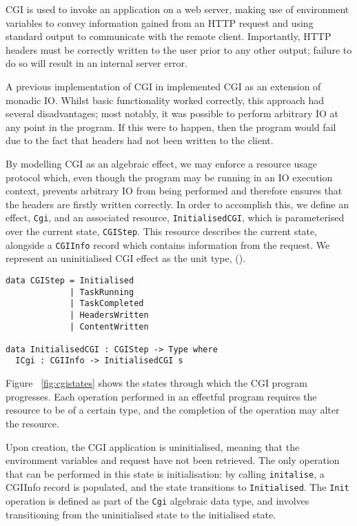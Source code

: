 \documentclass[preprint]{sigplanconf}
\begin{document}
CGI is used to invoke an application on a web server, making use of environment variables to convey information gained from an HTTP request and using standard output to communicate with the remote client. Importantly, HTTP headers must be correctly written to the user prior to any other output; failure to do so will result in an internal server error.

A previous implementation of CGI in \idris{} implemented CGI as an extension of monadic IO. Whilst basic functionality worked correctly, this approach had several disadvantages; most notably, it was possible to perform arbitrary IO at any point in the program. If this were to happen, then the program would fail due to the fact that headers had not been written to the client.

By modelling CGI as an algebraic effect, we may enforce a resource usage protocol which, even though the program may be running in an IO execution context, prevents arbitrary IO from being performed and therefore ensures that the headers are firstly written correctly. In order to accomplish this, we define an effect, \texttt{Cgi}, and an associated resource, \texttt{InitialisedCGI}, which is parameterised over the current state, \texttt{CGIStep}. This resource describes the current state, alongside a \texttt{CGIInfo} record which contains information from the request. We represent an uninitialised CGI effect as the unit type, ().

\begin{verbatim}
data CGIStep = Initialised 
             | TaskRunning 
             | TaskCompleted 
             | HeadersWritten 
             | ContentWritten

data InitialisedCGI : CGIStep -> Type where
  ICgi : CGIInfo -> InitialisedCGI s
\end{verbatim}

Figure ~\ref{fig:cgistates} shows the states through which the CGI program progresses. Each operation performed in an effectful program requires the resource to be of a certain type, and the completion of the operation may alter the resource.

Upon creation, the CGI application is uninitialised, meaning that the environment variables and request have not been retrieved. The only operation that can be performed in this state is initialisation: by calling \texttt{initalise}, a CGIInfo record is populated, and the state transitions to \texttt{Initialised}. The \texttt{Init} operation is defined as part of the \texttt{Cgi} algebraic data type, and involves transitioning from the uninitialised state to the initialised state.
\end{document}
